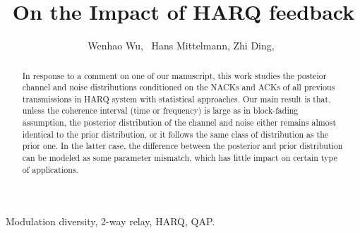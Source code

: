 \documentclass[journal,draftcls,onecolumn,12pt,twoside]{IEEEtran}
\begin{document}
%
\title{On the Impact of HARQ feedback}
%
%
%

\author{
  Wenhao Wu,~
  Hans Mittelmann,
  Zhi Ding,~
}

\maketitle

\begin{abstract}
  In response to a comment on one of our manuscript, this work studies the
  posteior channel and noise distributions conditioned on the NACKs and ACKs of
  all previous transmissions in HARQ system with statistical approaches. Our main
  result is that, unless the coherence interval (time or frequency) is large as
  in block-fading assumption, the posterior distribution of the channel and
  noise either remains almost identical to the prior distribution, or it
  follows the same class of distribution as the prior one. In the latter case,
  the difference between the posterior and prior distribution can be modeled as
  some parameter mismatch, which has little impact on certain type of
  applications.
\end{abstract}

\begin{IEEEkeywords}
  Modulation diversity, 2-way relay, HARQ, QAP.
\end{IEEEkeywords}






%
\IEEEpeerreviewmaketitle
\end{document}
